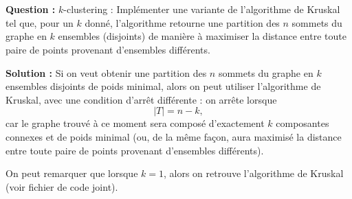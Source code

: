 \documentclass[11pt]{article} %
\newenvironment{question}[1][\unskip]{%
	\par
	\noindent
	\textbf{Question #1:}
	\noindent}
{\medskip}
\newenvironment{solution}[1][\unskip]{%
	\par
	\noindent
	\textbf{Solution #1:}
	\noindent}
{\medskip}
\begin{document}
\section{}
\begin{question}
	$k$-clustering : Implémenter une variante de l'algorithme de Kruskal tel que, pour un $k$ donné, l'algorithme retourne une partition des $n$ sommets du graphe en $k$ ensembles (disjoints) de manière à maximiser la distance entre toute paire de points provenant d'ensembles différents.
\end{question}
\begin{solution}
	Si on veut obtenir une partition des $n$ sommets du graphe en $k$ ensembles disjoints de poids minimal, alors on peut utiliser l'algorithme de Kruskal, avec une condition d'arrêt différente : on arrête lorsque
	$$|T| = n-k,$$
	car le graphe trouvé à ce moment sera composé d'exactement $k$ composantes connexes et de poids minimal (ou, de la même façon, aura maximisé la distance entre toute paire de points provenant d'ensembles différents).
	
	On peut remarquer que lorsque $k=1$, alors on retrouve l'algorithme de Kruskal (voir fichier de code joint).
	
\end{solution}
	
	
\end{document}
